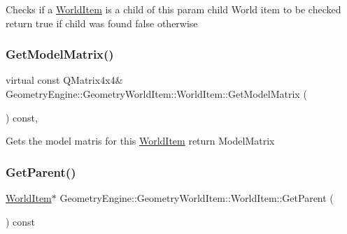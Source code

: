 Checks if a \mbox{\hyperlink{class_geometry_engine_1_1_geometry_world_item_1_1_world_item}{World\+Item}} is a child of this param child World item to be checked return true if child was found false otherwise \mbox{\label{class_geometry_engine_1_1_geometry_world_item_1_1_world_item_a341eff00c85bddf6ced93102ddf18408}} 
\subsubsection{\texorpdfstring{GetModelMatrix()}{GetModelMatrix()}}
{\footnotesize\ttfamily virtual const Q\+Matrix4x4\& Geometry\+Engine\+::\+Geometry\+World\+Item\+::\+World\+Item\+::\+Get\+Model\+Matrix (\begin{DoxyParamCaption}{ }\end{DoxyParamCaption}) const\hspace{0.3cm}{\ttfamily [inline]}, {\ttfamily [virtual]}}

Gets the model matris for this \mbox{\hyperlink{class_geometry_engine_1_1_geometry_world_item_1_1_world_item}{World\+Item}} return Model\+Matrix \mbox{\label{class_geometry_engine_1_1_geometry_world_item_1_1_world_item_a8b4ce24b3f39abee45d37e539ddb52c1}} 
\subsubsection{\texorpdfstring{GetParent()}{GetParent()}}
{\footnotesize\ttfamily \mbox{\hyperlink{class_geometry_engine_1_1_geometry_world_item_1_1_world_item}{World\+Item}}$\ast$ Geometry\+Engine\+::\+Geometry\+World\+Item\+::\+World\+Item\+::\+Get\+Parent (\begin{DoxyParamCaption}{ }\end{DoxyParamCaption}) const\hspace{0.3cm}{\ttfamily [inline]}}


